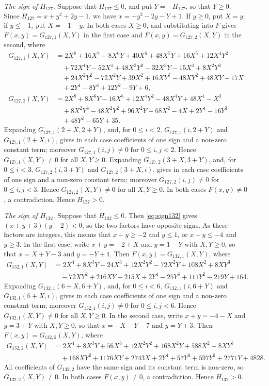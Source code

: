 \documentclass[11pt]{article}
\begin{document}
\emph{The sign of $H_{127}$.} Suppose that $H_{127}\leq0$, and put $Y=-H_{127}$, so that $Y\geq0$. Since $H_{127}=x+y^{2}+2y-1$, we have $x=-y^{2}-2y-Y+1$. If $y\geq0$, put $X=y$; if $y\leq-1$, put $X=-1-y$. In both cases $X\geq0$, and substituting into $F$ gives $F(x,y)=G_{127,1}(X,Y)$ in the first case and $F(x,y)=G_{127,2}(X,Y)$ in the second, where
\begin{align*}
G_{127,1}(X,Y)&=2X^{8}+16X^{7}+8X^{6}Y+40X^{6}+48X^{5}Y+16X^{5}+12X^{4}Y^{2}\\
&\quad+72X^{4}Y-52X^{4}+48X^{3}Y^{2}-32X^{3}Y-15X^{3}+8X^{2}Y^{3}\\
&\quad+24X^{2}Y^{2}-72X^{2}Y+39X^{2}+16XY^{3}-48XY^{2}+48XY-17X\\
&\quad+2Y^{4}-8Y^{3}+12Y^{2}-9Y+6,\\
G_{127,2}(X,Y)&=2X^{8}+8X^{6}Y-16X^{6}+12X^{4}Y^{2}-48X^{4}Y+48X^{4}-X^{3}\\
&\quad+8X^{2}Y^{3}-48X^{2}Y^{2}+96X^{2}Y-68X^{2}-4X+2Y^{4}-16Y^{3}\\
&\quad+48Y^{2}-65Y+35.
\end{align*}
Expanding $G_{127,1}(2+X,2+Y)$, and, for $0\leq i<2$, $G_{127,1}(i,2+Y)$ and $G_{127,1}(2+X,i)$, gives in each case coefficients of one sign and a non-zero constant term; moreover $G_{127,1}(i,j)\neq0$ for $0\leq i,j<2$. Hence $G_{127,1}(X,Y)\neq0$ for all $X,Y\geq0$. Expanding $G_{127,2}(3+X,3+Y)$, and, for $0\leq i<3$, $G_{127,2}(i,3+Y)$ and $G_{127,2}(3+X,i)$, gives in each case coefficients of one sign and a non-zero constant term; moreover $G_{127,2}(i,j)\neq0$ for $0\leq i,j<3$. Hence $G_{127,2}(X,Y)\neq0$ for all $X,Y\geq0$. In both cases $F(x,y)\neq0$, a contradiction. Hence $H_{127}>0$.

\emph{The sign of $H_{132}$.} Suppose that $H_{132}\leq0$. Then \eqref{eq:sign132} gives $(x+y+3)(y-2)<0$, so the two factors have opposite signs. As these factors are integers, this means that $x+y\geq-2$ and $y\leq1$, or $x+y\leq-4$ and $y\geq3$. In the first case, write $x+y=-2+X$ and $y=1-Y$ with $X,Y\geq0$, so that $x=X+Y-3$ and $y=-Y+1$. Then $F(x,y)=G_{132,1}(X,Y)$, where
\begin{align*}
G_{132,1}(X,Y)&=2X^{4}+8X^{3}Y-24X^{3}+12X^{2}Y^{2}-72X^{2}Y+108X^{2}+8XY^{3}\\
&\quad-72XY^{2}+216XY-215X+2Y^{4}-25Y^{3}+111Y^{2}-219Y+164.
\end{align*}
Expanding $G_{132,1}(6+X,6+Y)$, and, for $0\leq i<6$, $G_{132,1}(i,6+Y)$ and $G_{132,1}(6+X,i)$, gives in each case coefficients of one sign and a non-zero constant term; moreover $G_{132,1}(i,j)\neq0$ for $0\leq i,j<6$. Hence $G_{132,1}(X,Y)\neq0$ for all $X,Y\geq0$. In the second case, write $x+y=-4-X$ and $y=3+Y$ with $X,Y\geq0$, so that $x=-X-Y-7$ and $y=Y+3$. Then $F(x,y)=G_{132,2}(X,Y)$, where
\begin{align*}
G_{132,2}(X,Y)&=2X^{4}+8X^{3}Y+56X^{3}+12X^{2}Y^{2}+168X^{2}Y+588X^{2}+8XY^{3}\\
&\quad+168XY^{2}+1176XY+2743X+2Y^{4}+57Y^{3}+597Y^{2}+2771Y+4828.
\end{align*}
All coefficients of $G_{132,2}$ have the same sign and its constant term is non-zero, so $G_{132,2}(X,Y)\neq0$. In both cases $F(x,y)\neq0$, a contradiction. Hence $H_{132}>0$.
\end{document}
